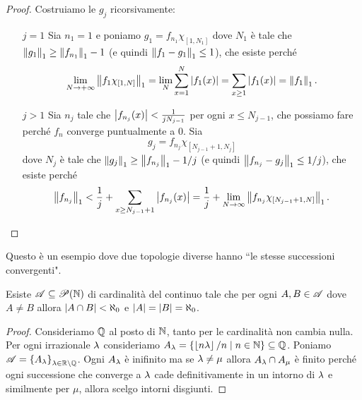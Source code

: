 \begin{proof}
Costruiamo le $g_j$ ricorsivamente:
\setlength{\leftmargini}{0cm}
\begin{itemize}
\item[$\boxed{j=1}$] Sia $n_1=1$ e poniamo $g_1=f_{n_1}\chi_{[1,N_1]}$ dove $N_1$ \`e tale che $\left\Vert{g_1}\right\Vert_1\geq \left\Vert{f_{n_1}}\right\Vert_1-1$ (e quindi $\left\Vert{f_1-g_1}\right\Vert_1\leq 1$), che esiste perch\'e 
\[\lim_{N\to+\infty}\left\Vert{f_1\chi_{[1,N]}}\right\Vert_1=\lim_N\sum_{x=1}^N\left|{f_1(x)}\right|=\sum_{x\geq 1}\left|{f_1(x)}\right|=\left\Vert{f_1}\right\Vert_1.\]
\item[$\boxed{j>1}$] Sia $n_j$ tale che $\left|{f_{n_j}(x)}\right|<\frac1{j N_{j-1}}$ per ogni $x\leq N_{j-1}$, che possiamo fare perch\'e $f_n$ converge puntualmente a $0$. Sia
\[g_j=f_{n_j}\chi_{[N_{j-1}+1,N_j]}\]
dove $N_j$ \`e tale che $\left\Vert{g_j}\right\Vert_1\geq \left\Vert{f_{n_j}}\right\Vert_1-1/j$ (e quindi $\left\Vert{f_{n_j}-g_j}\right\Vert_1\leq 1/j$), che esiste perch\'e
\[\left\Vert{f_{n_j}}\right\Vert_1< \frac1j+\sum_{x\geq N_{j-1}+1}\left|{f_{n_j}(x)}\right|=\frac1j+\lim_{N\to\infty}\left\Vert{f_{n_j}\chi_{[N_{j-1}+1,N]}}\right\Vert_1.\]
\end{itemize}
\setlength{\leftmargini}{0.5cm}
\end{proof}

\begin{remark}
Questo \`e un esempio dove due topologie diverse hanno ``le stesse successioni convergenti".
\end{remark}







\begin{fact}\label{FcQuasipartizioneDiNConInfinitiElementiMaFiniteIntersezioni}
Esiste $\mathscr{A}\subseteq \mathscr{P}(\mathbb{N})$ di cardinalit\`a del continuo tale che per ogni $A,B\in \mathscr{A}$ dove $A\neq B$ allora $\left|{A\cap B}\right|<\aleph_0$ e $\left|{A}\right|=\left|{B}\right|=\aleph_0$.
\end{fact}
\begin{proof}
Consideriamo $\mathbb{Q}$ al posto di $\mathbb{N}$, tanto per le cardinalit\`a non cambia nulla. Per ogni irrazionale $\lambda$ consideriamo $A_\lambda=\left\{{\left\lfloor {n\lambda}\right\rfloor/n\mid n\in\mathbb{N}}\right\}\subseteq \mathbb{Q}$. Poniamo $\mathscr{A}=\left\{{A_\lambda}\right\}_{\lambda\in\mathbb{R}\setminus\mathbb{Q}}$. Ogni $A_\lambda$ \`e inifinito ma se $\lambda\neq \mu$ allora $A_\lambda\cap A_\mu$ \`e finito perch\'e ogni successione che converge a $\lambda$ cade definitivamente in un intorno di $\lambda$ e similmente per $\mu$, allora scelgo intorni disgiunti.
\end{proof}



